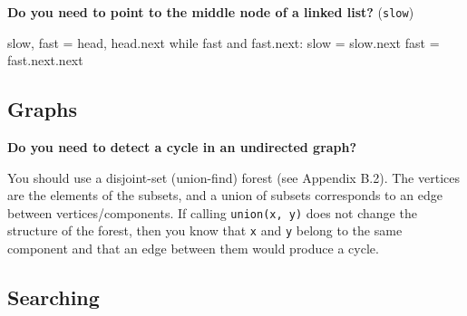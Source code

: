 \documentclass[12pt]{article}
\begin{document}
\begin{adjustwidth}{2em}{0pt}
\textbf{Do you need to point to the middle node of a linked list?} (\texttt{slow})
\begin{python}
slow, fast = head, head.next
while fast and fast.next:
    slow = slow.next
    fast = fast.next.next
\end{python}

\end{adjustwidth}

\subsection*{Graphs}
\begin{adjustwidth}{2em}{0pt}
\textbf{Do you need to detect a cycle in an undirected graph?} \medskip

You should use a disjoint-set (union-find) forest (see Appendix B.2). The vertices are the elements of the subsets, and a union of subsets corresponds to an edge between vertices/components. If calling \texttt{union(x, y)} does not change the structure of the forest, then you know that \texttt{x} and \texttt{y} belong to the same component and that an edge between them would produce a cycle.
\end{adjustwidth}

\subsection*{Searching}
\end{document}
